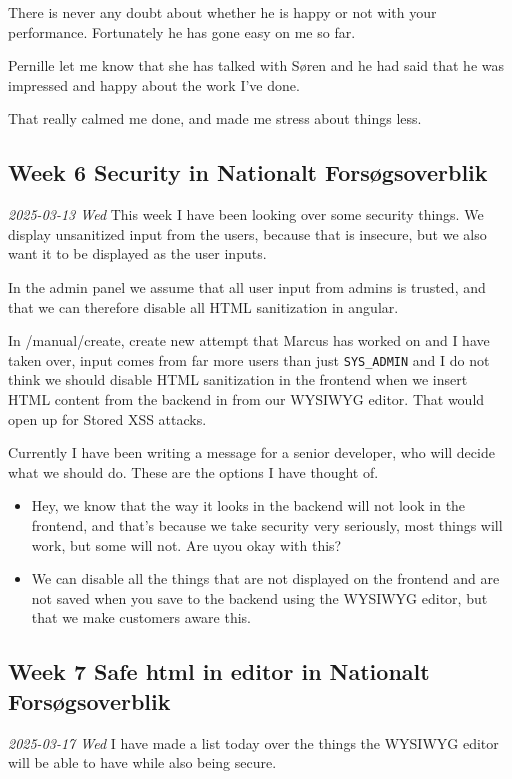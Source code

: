 \documentclass[../main.tex]{subfiles}
\begin{document}
There is never any doubt about whether he is happy or not with your performance. Fortunately he has gone easy on me so far.

Pernille let me know that she has talked with Søren and he had said that he was impressed and happy about the work I've
done.

That really calmed me done, and made me stress about things less. \\

\subsection{Week 6 Security in Nationalt Forsøgsoverblik}
\noindent \textit{2025-03-13 Wed}
This week I have been looking over some security things. We display unsanitized input from the users, because that is insecure, but we also want it to be displayed as the user inputs.

In the admin panel we assume that all user input from admins is trusted, and that we can therefore disable all HTML sanitization in angular.

In /manual/create, create new attempt that Marcus has worked on and I have taken over, input comes from far more users than just \verb|SYS_ADMIN| and I do not think we should disable HTML sanitization in the frontend when we insert HTML content from the backend in from our WYSIWYG editor. That would open up for Stored XSS attacks.

Currently I have been writing a message for a senior developer, who will decide what we should do. These are the options I have thought of.

\begin{itemize}
    \item Hey, we know that the way it looks in the backend will not look in the frontend, and that's because we take security very seriously, most things will work, but some will not. Are uyou okay with this?
    \item We can disable all the things that are not displayed on the frontend and are not saved when you save to the backend using the WYSIWYG editor, but that we make customers aware this.
\end{itemize}




\subsection{Week 7 Safe html in editor in Nationalt Forsøgsoverblik}
\noindent \textit{2025-03-17 Wed}
I have made a list today over the things the WYSIWYG editor will be able to have while also being secure. 
\end{document}
